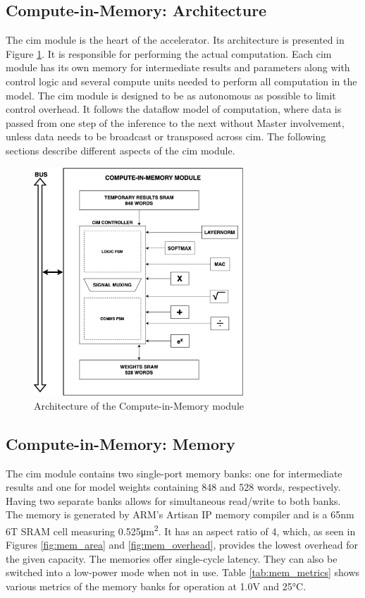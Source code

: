 \subsection{Compute-in-Memory: Architecture}
The \ac{cim} module is the heart of the accelerator. Its architecture is presented in Figure \ref{fig:cim_arch}. It is responsible for performing the actual computation. Each \ac{cim}
module has its own memory for intermediate results and parameters along with control logic and several compute units needed to perform all computation in the model. The \ac{cim} module
is designed to be as autonomous as possible to limit control overhead. It follows the dataflow model of computation, where data is passed from one step of the inference to the next without
Master involvement, unless data needs to be broadcast or transposed across \ac{cim}. The following sections describe different aspects of the \ac{cim} module.
\begin{figure}
    \centering
    \includegraphics[width=0.7\textwidth]{assets/cim_arch.png}
    \caption{Architecture of the Compute-in-Memory module}
    \label{fig:cim_arch}
\end{figure}

\subsection{Compute-in-Memory: Memory}
The \ac{cim} module contains two single-port memory banks: one for intermediate results and one for model weights containing 848 and 528 words, respectively. Having two separate banks
allows for simultaneous read/write to both banks. The memory is generated by ARM's Artisan IP memory compiler and is a 65nm 6T SRAM cell measuring 0.525\si{\square\micro\meter}. It has
an aspect ratio of 4, which, as seen in Figures \ref{fig:mem_area} and \ref{fig:mem_overhead}, provides the lowest overhead for the given capacity. The memories offer single-cycle latency.
They can also be switched into a low-power mode when not in use. Table \ref{tab:mem_metrics} shows various metrics of the memory banks for operation at 1.0V and 25\si{\degreeCelsius}. 

